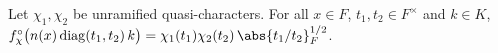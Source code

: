 Let $\chi_1,\chi_2$ be unramified quasi-characters. For all $x\in F$, $t_1,t_2\in F^\times$ and $k\in K$, $f^\circ_\chi\bigl(n(x)\,\mathrm{diag}(t_1,t_2)\,k\bigr)=\chi_1(t_1)\chi_2(t_2)\,\abs{t_1/t_2}_F^{1/2}$.
